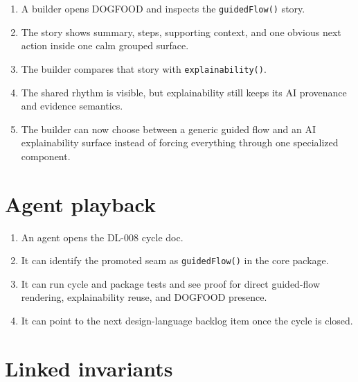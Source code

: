 \begin{enumerate}
\def\labelenumi{\arabic{enumi}.}
\tightlist
\item
  A builder opens DOGFOOD and inspects the \texttt{g\allowbreak{}u\allowbreak{}i\allowbreak{}d\allowbreak{}e\allowbreak{}d\allowbreak{}F\allowbreak{}l\allowbreak{}o\allowbreak{}w\allowbreak{}(\allowbreak{})} story.
\item
  The story shows summary, steps, supporting context, and one obvious next action inside one calm grouped surface.
\item
  The builder compares that story with \texttt{e\allowbreak{}x\allowbreak{}p\allowbreak{}l\allowbreak{}a\allowbreak{}i\allowbreak{}n\allowbreak{}a\allowbreak{}b\allowbreak{}i\allowbreak{}l\allowbreak{}i\allowbreak{}t\allowbreak{}y\allowbreak{}(\allowbreak{})}.
\item
  The shared rhythm is visible, but explainability still keeps its AI provenance and evidence semantics.
\item
  The builder can now choose between a generic guided flow and an AI explainability surface instead of forcing everything through one specialized component.
\end{enumerate}

\section{Agent playback}\label{record-175-agent-playback}

\begin{enumerate}
\def\labelenumi{\arabic{enumi}.}
\tightlist
\item
  An agent opens the DL-008 cycle doc.
\item
  It can identify the promoted seam as \texttt{g\allowbreak{}u\allowbreak{}i\allowbreak{}d\allowbreak{}e\allowbreak{}d\allowbreak{}F\allowbreak{}l\allowbreak{}o\allowbreak{}w\allowbreak{}(\allowbreak{})} in the core package.
\item
  It can run cycle and package tests and see proof for direct guided-flow rendering, explainability reuse, and DOGFOOD presence.
\item
  It can point to the next design-language backlog item once the cycle is closed.
\end{enumerate}

\section{Linked invariants}\label{record-175-linked-invariants}


